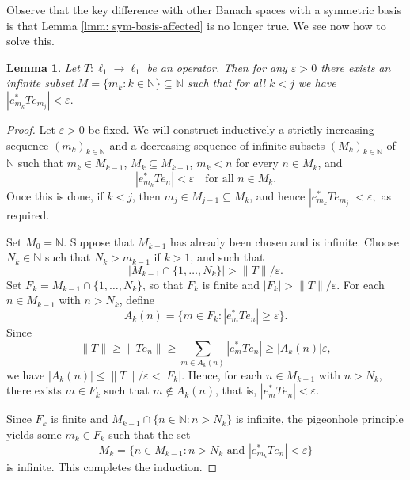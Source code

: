 \documentclass[11pt]{amsart}
\theoremstyle{plain}
\newtheorem{lemma}[theorem]{Lemma}
\theoremstyle{definition}
\numberwithin{equation}{section}
\newcommand{\norm}[1]{\lVert #1 \rVert}
\newcommand{\N}{\mathbb{N}}
\renewcommand{\leq}{\leqslant}
\renewcommand{\geq}{\geqslant}
\begin{document}
Observe that the key difference with other Banach spaces with a symmetric basis is that Lemma \ref{lmm: sym-basis-affected} is no longer true. We see now how to solve this.

\begin{lemma}\label{lmm: ell1-future-interference}
    Let $T \colon \ell_1 \to \ell_1$ be an operator. Then for any $\varepsilon > 0$ there exists an infinite subset $M = \{m_k: k \in \N \} \subseteq \N$ such that for all $k < j$ we have
    \(
        |e_{m_k}^* T e_{m_j}| < \varepsilon.
    \)
\end{lemma}
\begin{proof}
    Let $\varepsilon > 0$ be fixed. We will construct inductively a strictly increasing sequence $(m_k)_{k \in \N}$ and a decreasing sequence of infinite subsets $(M_k)_{k \in \N}$ of $\N$ such that $m_k \in M_{k-1}$, $M_k \subseteq M_{k-1}$, $m_k < n$ for every $n \in M_k$, and
    \begin{equation*}
        |e_{m_k}^* T e_n| < \varepsilon \quad \text{for all } n \in M_k.
    \end{equation*}
    Once this is done, if $k < j$, then $m_j \in M_{j-1} \subseteq M_k$, and hence
    \(
        |e_{m_k}^* T e_{m_j}| < \varepsilon,
    \)
    as required.

    Set $M_0 = \N$. Suppose that $M_{k-1}$ has already been chosen and is infinite. Choose $N_k \in \N$ such that $N_k > m_{k-1}$ if $k > 1$, and such that
    \begin{equation*}
        |M_{k-1} \cap \{1, \dots, N_k\}| > \norm{T}/\varepsilon.
    \end{equation*}
    Set $F_k = M_{k-1} \cap \{1, \dots, N_k\}$, so that $F_k$ is finite and $|F_k| > \norm{T}/\varepsilon$. For each $n \in M_{k-1}$ with $n > N_k$, define
    \begin{equation*}
        A_k(n) = \{m \in F_k : |e_m^* T e_n| \geq \varepsilon\}.
    \end{equation*}
    Since
    \begin{equation*}
        \norm{T} \geq \norm{Te_n} \geq \sum_{m \in A_k(n)} |e_m^* T e_n| \geq |A_k(n)| \varepsilon,
    \end{equation*}
    we have $|A_k(n)| \leq \norm{T}/\varepsilon < |F_k|$. Hence, for each $n \in M_{k-1}$ with $n > N_k$, there exists $m \in F_k$ such that $m \notin A_k(n)$, that is, $|e_m^* T e_n| < \varepsilon$.

    Since $F_k$ is finite and $M_{k-1} \cap \{n \in \N : n > N_k\}$ is infinite, the pigeonhole principle yields some $m_k \in F_k$ such that the set
    \begin{equation*}
        M_k = \{n \in M_{k-1} : n > N_k \text{ and } |e_{m_k}^* T e_n| < \varepsilon\}
    \end{equation*}
    is infinite. This completes the induction.
\end{proof}
\end{document}
